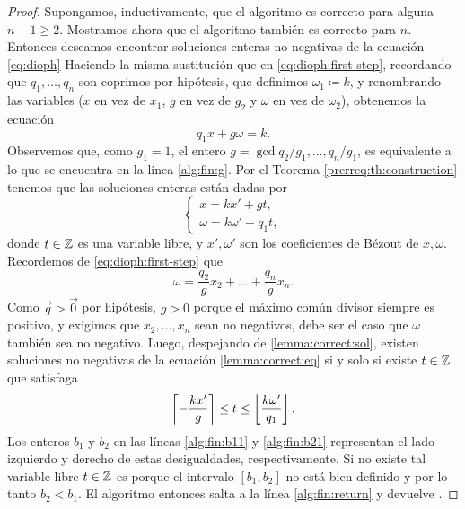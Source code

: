 \begin{proof}
	Supongamos, inductivamente, que el algoritmo es correcto para alguna $n - 1 \geq 2$. Mostramos
	ahora que el algoritmo también es correcto para $n$. Entonces deseamos encontrar soluciones
	enteras no negativas de la ecuación \eqref{eq:dioph} Haciendo la misma sustitución que en
	\eqref{eq:dioph:first-step}, recordando que $q_1, \ldots, q_n$ son coprimos por hipótesis, que
	definimos $\omega_1 \coloneq k$, y renombrando las variables ($x$ en vez de $x_1$, $g$ en vez de
	$g_2$ y $\omega$ en vez de $\omega_2$), obtenemos la ecuación
	\begin{equation}
		\label{lemma:correct:eq}
		q_1x + g\omega = k.
	\end{equation}
	Observemos que, como $g_1 = 1$, el entero $g = \gcd{q_2/g_1, \ldots, q_n/g_1}$, es equivalente a
	lo que se encuentra en la línea \eqref{alg:fin:g}. Por el Teorema \ref{prerreq:th:construction}
	tenemos que las soluciones enteras están dadas por
	\begin{equation}
		\label{lemma:correct:sol}
		\begin{cases}
			x = kx' + gt, \\
			\omega = k\omega' - q_1t,
		\end{cases}
	\end{equation}
	donde $t \in \mathbb{Z}$ es una variable libre, y $x', \omega'$ son los coeficientes de Bézout de $x,
	\omega$. Recordemos de \eqref{eq:dioph:first-step} que
	\begin{equation}
		\label{lemma:correct:eq-omega}
		\omega = \frac{q_2}{g}x_2 + \ldots + \frac{q_n}{g}x_n.
	\end{equation}
	Como $\vec{q} > \vec{0}$ por hipótesis, $g > 0$ porque el máximo común divisor siempre es
	positivo, y exigimos que $x_2, \ldots, x_n$ sean no negativos, debe ser el caso que $\omega$
	también sea no negativo. Luego, despejando de \ref{lemma:correct:sol}, existen soluciones no
	negativas de la ecuación \eqref{lemma:correct:eq} si y solo si existe $t \in \mathbb{Z}$ que satisfaga
	\begin{equation*}
		\left\lceil -\frac{kx'}{g} \right\rceil \leq t \leq \left\lfloor \frac{k\omega'}{q_1} \right\rfloor.
	\end{equation*}
	Los enteros $b_1$ y $b_2$ en las líneas \eqref{alg:fin:b11} y \eqref{alg:fin:b21} representan el
	lado izquierdo y derecho de estas desigualdades, respectivamente. Si no existe tal variable
	libre $t \in \mathbb{Z}$ es porque el intervalo $[b_1, b_2]$ no está bien definido y por lo tanto $b_2 <
	b_1$. El algoritmo entonces salta a la línea \eqref{alg:fin:return} y devuelve \NIL.


\end{proof}
